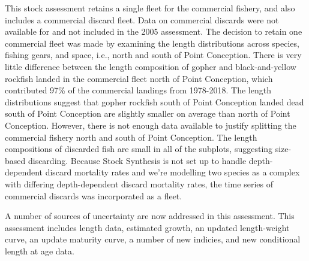 \documentclass[12pt,]{article}
\begin{document}
This stock assessment retains a single fleet for the commercial fishery,
and also includes a commercial discard fleet. Data on commercial
discards were not available for and not included in the 2005 assessment.
The decision to retain one commercial fleet was made by examining the
length distributions across species, fishing gears, and space, i.e.,
north and south of Point Conception. There is very little difference
between the length composition of gopher and black-and-yellow rockfish
landed in the commercial fleet north of Point Conception, which
contributed 97\% of the commercial landings from 1978-2018. The length
distributions suggest that gopher rockfish south of Point Conception
landed dead south of Point Conception are slightly smaller on average
than north of Point Conception. However, there is not enough data
available to justify splitting the commercial fishery north and south of
Point Conception. The length compositions of discarded fish are small in
all of the subplots, suggesting size-based discarding. Because Stock
Synthesis is not set up to handle depth-dependent discard mortality
rates and we're modelling two species as a complex with differing
depth-dependent discard mortality rates, the time series of commercial
discards was incorporated as a fleet.

A number of sources of uncertainty are now addressed in this assessment.
This assessment includes length data, estimated growth, an updated
length-weight curve, an update maturity curve, a number of new indicies,
and new conditional length at age data.
\end{document}
